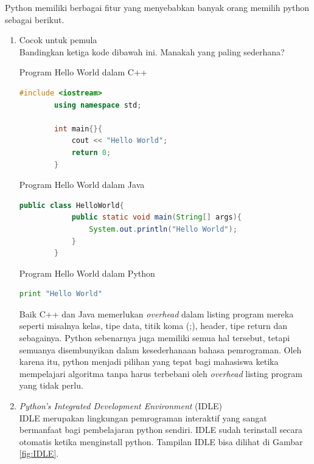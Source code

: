 Python memiliki berbagai fitur yang menyebabkan banyak orang memilih python sebagai berikut.
\begin{enumerate}
	\item Cocok untuk pemula
	\\Bandingkan ketiga kode dibawah ini. Manakah yang paling sederhana? 
	\begin{listprog}{Program Hello World dalam C++}
		\label{lst:helloWorldC++}
		\begin{lstlisting}[language=C++]
		#include <iostream>
		using namespace std;
		
		int main{}{
			cout << "Hello World";
			return 0;
		}
		\end{lstlisting}
	\end{listprog}
	\begin{listprog}{Program Hello World dalam Java}
		\label{lst:helloWorldJava}
		\begin{lstlisting}[language=Java]
		public class HelloWorld{
			public static void main(String[] args){
				System.out.println("Hello World");
			}
		}
		\end{lstlisting}
	\end{listprog}
	\begin{listprog}{Program Hello World dalam Python}
		\label{lst:helloWorldPython}
		\begin{lstlisting}[language=Python]
		print "Hello World"
		\end{lstlisting}
	\end{listprog}
	Baik C++ dan Java memerlukan \textit{overhead} dalam listing program mereka seperti misalnya kelas, tipe data, titik koma (;), header, tipe return dan sebagainya. Python sebenarnya juga memiliki semua hal tersebut, tetapi semuanya disembunyikan dalam kesederhanaan bahasa pemrograman. Oleh karena itu, python menjadi pilihan yang tepat bagi mahasiswa ketika mempelajari algoritma tanpa harus terbebani oleh \textit{overhead} listing program yang tidak perlu.
	\item \textit{Python's Integrated Development Environment} (IDLE)
	\\IDLE merupakan lingkungan pemrograman interaktif yang sangat bermanfaat bagi pembelajaran python sendiri. IDLE sudah terinstall secara otomatis ketika menginstall python. Tampilan IDLE bisa dilihat di Gambar \ref{fig:IDLE}. 
	

\end{enumerate}
